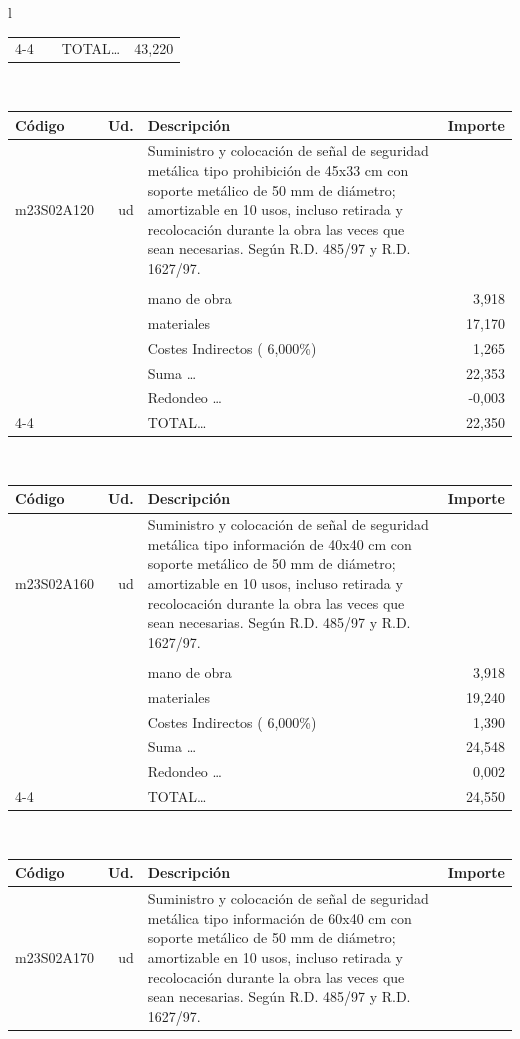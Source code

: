 \documentclass{book}%
\begin{document}
\begin{longtable}{l}
\begin{tabular}{l r p{60mm} r}
\cline{4-4}%
&&TOTAL\ldots&    43,220\\%
\end{tabular}\\%
\begin{tabular}{l r p{60mm} r}%
Código&Ud.&Descripción&Importe\\%
\hline%
m23S02A120&ud&Suministro y colocación de señal de seguridad metálica tipo prohibición de 45x33 cm con soporte metálico de 50 mm de diámetro; amortizable en 10 usos, incluso retirada y recolocación durante la obra las veces que sean necesarias. Según R.D. 485/97 y R.D. 1627/97.&\\%
&&&\\%
&&mano de obra&     3,918\\%
&&materiales&    17,170\\%
&&Costes Indirectos (     6,000\%)&     1,265\\%
&&Suma \ldots&    22,353\\%
&&Redondeo \ldots&    {-}0,003\\%
\cline{4-4}%
&&TOTAL\ldots&    22,350\\%
\end{tabular}\\%
\begin{tabular}{l r p{60mm} r}%
Código&Ud.&Descripción&Importe\\%
\hline%
m23S02A160&ud&Suministro y colocación de señal de seguridad metálica tipo información de 40x40 cm con soporte metálico de 50 mm de diámetro; amortizable en 10 usos, incluso retirada y recolocación durante la obra las veces que sean necesarias. Según R.D. 485/97 y R.D. 1627/97.&\\%
&&&\\%
&&mano de obra&     3,918\\%
&&materiales&    19,240\\%
&&Costes Indirectos (     6,000\%)&     1,390\\%
&&Suma \ldots&    24,548\\%
&&Redondeo \ldots&     0,002\\%
\cline{4-4}%
&&TOTAL\ldots&    24,550\\%
\end{tabular}\\%
\begin{tabular}{l r p{60mm} r}%
Código&Ud.&Descripción&Importe\\%
\hline%
m23S02A170&ud&Suministro y colocación de señal de seguridad metálica tipo información de 60x40 cm con soporte metálico de 50 mm de diámetro; amortizable en 10 usos, incluso retirada y recolocación durante la obra las veces que sean necesarias. Según R.D. 485/97 y R.D. 1627/97.&\\%

\end{tabular}
\end{longtable}
\end{document}
